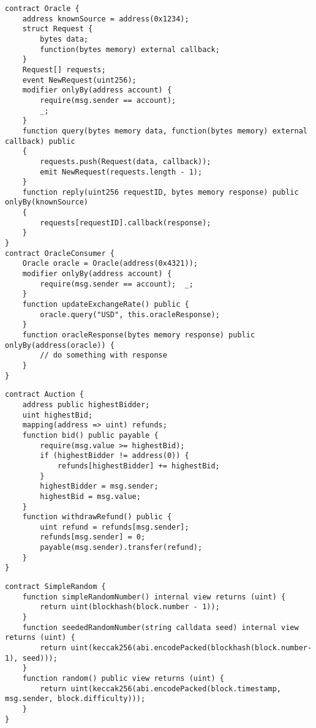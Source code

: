 {{\label{appendix:oracle}\begin{lstlisting}[language=Solidity, caption={Codice di riferimento per Oracle}]
contract Oracle {
	address knownSource = address(0x1234);
	struct Request {
		bytes data;
		function(bytes memory) external callback;
	}
	Request[] requests;
	event NewRequest(uint256);
	modifier onlyBy(address account) {
		require(msg.sender == account);
		_;
	}
	function query(bytes memory data, function(bytes memory) external callback) public
	{
		requests.push(Request(data, callback));
		emit NewRequest(requests.length - 1);
	}
	function reply(uint256 requestID, bytes memory response) public onlyBy(knownSource)
	{
		requests[requestID].callback(response);
	}
}
contract OracleConsumer {
	Oracle oracle = Oracle(address(0x4321));
	modifier onlyBy(address account) { 
		require(msg.sender == account);  _; 
	}
	function updateExchangeRate() public {
		oracle.query("USD", this.oracleResponse);
	}
	function oracleResponse(bytes memory response) public onlyBy(address(oracle)) {
		// do something with response
	}
}
\end{lstlisting}}

{\label{appendix:pull_over_push}\begin{lstlisting}[language=Solidity, caption={Codice di riferimento per Pull Over Push}]
contract Auction {
	address public highestBidder;
	uint highestBid;
	mapping(address => uint) refunds;
	function bid() public payable {
		require(msg.value >= highestBid);
		if (highestBidder != address(0)) {
			refunds[highestBidder] += highestBid; 
		}
		highestBidder = msg.sender;
		highestBid = msg.value;
	}
	function withdrawRefund() public {
		uint refund = refunds[msg.sender];
		refunds[msg.sender] = 0;
		payable(msg.sender).transfer(refund);
	}
}
\end{lstlisting}}

\newpage

{\label{appendix:randomness}\begin{lstlisting}[language=Solidity, caption={Codice di riferimento per Randomness}]
contract SimpleRandom {
	function simpleRandomNumber() internal view returns (uint) {
		return uint(blockhash(block.number - 1));
	}
	function seededRandomNumber(string calldata seed) internal view returns (uint) {
		return uint(keccak256(abi.encodePacked(blockhash(block.number-1), seed)));
	}
	function random() public view returns (uint) {
		return uint(keccak256(abi.encodePacked(block.timestamp, msg.sender, block.difficulty)));
	}
}
\end{lstlisting}}

}
